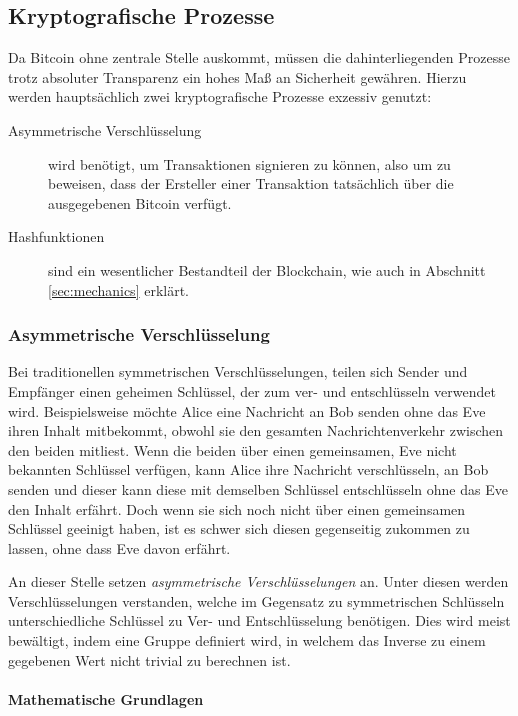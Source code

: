 \subsection{Kryptografische Prozesse}

Da Bitcoin ohne zentrale Stelle auskommt, müssen die dahinterliegenden Prozesse trotz absoluter Transparenz ein hohes Maß an Sicherheit gewähren.
Hierzu werden hauptsächlich zwei kryptografische Prozesse exzessiv genutzt:
\begin{description}
    \item[Asymmetrische Verschlüsselung] wird benötigt, um Transaktionen signieren zu können, also um zu beweisen, dass der Ersteller einer Transaktion tatsächlich über die ausgegebenen Bitcoin verfügt.
    \item[Hashfunktionen] sind ein wesentlicher Bestandteil der Blockchain, wie auch in Abschnitt \ref{sec:mechanics} erklärt.
\end{description}

\subsubsection{Asymmetrische Verschlüsselung}

Bei traditionellen symmetrischen Verschlüsselungen, teilen sich Sender und Empfänger einen geheimen Schlüssel, der zum ver- und entschlüsseln verwendet wird.
Beispielsweise möchte Alice eine Nachricht an Bob senden ohne das Eve ihren Inhalt mitbekommt, obwohl sie den gesamten Nachrichtenverkehr zwischen den beiden mitliest.
Wenn die beiden über einen gemeinsamen, Eve nicht bekannten Schlüssel verfügen, kann Alice ihre Nachricht verschlüsseln, an Bob senden und dieser kann diese mit demselben Schlüssel entschlüsseln ohne das Eve den Inhalt erfährt.
Doch wenn sie sich noch nicht über einen gemeinsamen Schlüssel geeinigt haben, ist es schwer sich diesen gegenseitig zukommen zu lassen, ohne dass Eve davon erfährt.

An dieser Stelle setzen \emph{asymmetrische Verschlüsselungen} an.
Unter diesen werden Verschlüsselungen verstanden, welche im Gegensatz zu symmetrischen Schlüsseln unterschiedliche Schlüssel zu Ver- und Entschlüsselung benötigen.
Dies wird meist bewältigt, indem eine Gruppe definiert wird, in welchem das Inverse zu einem gegebenen Wert nicht trivial zu berechnen ist.

\paragraph{Mathematische Grundlagen}

